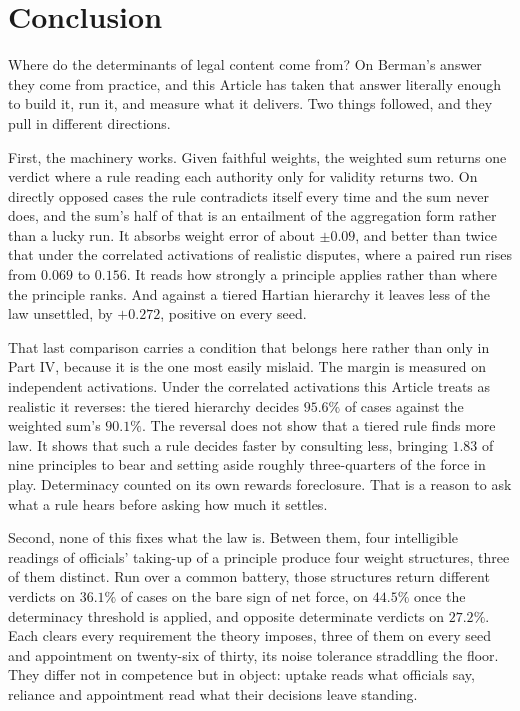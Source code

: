 \section{Conclusion}

Where do the determinants of legal content come from? On Berman's answer
they come from practice, and this Article has taken that answer literally
enough to build it, run it, and measure what it delivers. Two things
followed, and they pull in different directions.

First, the machinery works. Given faithful weights, the
weighted sum returns one verdict where a rule reading each authority
only for validity returns two. On directly opposed cases the rule contradicts itself every time and the sum
never does, and the sum's half of that is an entailment of the aggregation
form rather than a lucky run. It absorbs weight error of about $\pm 0.09$, and better than twice that
under the correlated activations of realistic disputes, where a paired run
rises from $0.069$ to $0.156$. It reads how strongly a principle applies
rather than where the principle ranks. And against a tiered Hartian
hierarchy it leaves less of the law unsettled, by $+0.272$, positive on
every seed.

That last comparison carries a condition that belongs here
rather than only in Part IV, because it is the one most easily mislaid. The
margin is measured on independent activations. Under the correlated
activations this Article treats as realistic it reverses: the tiered
hierarchy decides $95.6\%$ of cases against the weighted sum's $90.1\%$.
The reversal does not show that a tiered rule finds more law. It shows that
such a rule decides faster by consulting less, bringing $1.83$ of nine
principles to bear and setting aside roughly three-quarters of the force in
play. Determinacy counted on its own rewards foreclosure. That is a reason
to ask what a rule hears before asking how much it settles.

Second, none of this fixes what the law is. Between them, four intelligible
readings of officials' taking-up of a principle produce four weight
structures, three of them distinct. Run over a common battery,
those structures return different verdicts on $36.1\%$ of cases on the bare
sign of net force, on $44.5\%$ once the determinacy threshold is applied, and
opposite determinate verdicts on $27.2\%$. Each clears every requirement the theory imposes, three of them on every
seed and appointment on twenty-six of thirty, its noise tolerance
straddling the floor. They differ not in competence but in
object: uptake reads what officials say, reliance and appointment read
what their decisions leave standing.

